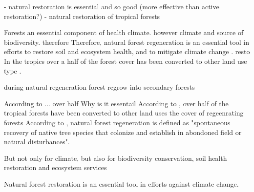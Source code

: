 - natural restoration is essential and so good (more effective than active restoration?)
- natural restoration of tropical forests

Forests an essential component of health climate. however climate and source of biodiversity. therefore
Therefore, natural forest regeneration is an essential tool in efforts to restore soil and ecosystem health, and to mitigate climate change \citep{hordijkLandUseHistory2024}.  resto In the tropics over a half of the forest cover has been converted to other land use type \citep{chazdonNaturalRegenerationTool2016}.

during natural regeneration forest regrow into secondary forests

According to ... over half Why is it essentail According to \citet{chazdonNaturalRegenerationTool2016}, over half of the tropical forests have been converted to other land uses the cover of regeenrating forests
According to \citet{crouzeillesEcologicalRestorationSuccess2017}, natural forest regeneration is defined as "spontaneous recovery of native tree species that colonize and establish in abondoned field or natural disturbances".

But not only for climate, but also for biodiversity conservation, soil health restoration and ecosystem services

Natural forest restoration is an essential tool in efforts against climate change.
